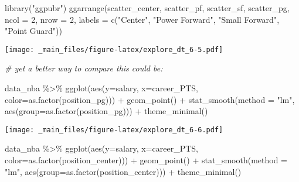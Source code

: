 \documentclass[
]{book}
\newenvironment{Shaded}{\begin{snugshade}}{\end{snugshade}}
\newcommand{\AttributeTok}[1]{\textcolor[rgb]{0.77,0.63,0.00}{#1}}
\newcommand{\CommentTok}[1]{\textcolor[rgb]{0.56,0.35,0.01}{\textit{#1}}}
\newcommand{\DecValTok}[1]{\textcolor[rgb]{0.00,0.00,0.81}{#1}}
\newcommand{\FunctionTok}[1]{\textcolor[rgb]{0.00,0.00,0.00}{#1}}
\newcommand{\NormalTok}[1]{#1}
\newcommand{\SpecialCharTok}[1]{\textcolor[rgb]{0.00,0.00,0.00}{#1}}
\newcommand{\StringTok}[1]{\textcolor[rgb]{0.31,0.60,0.02}{#1}}
\begin{document}
\begin{Shaded}
\begin{Highlighting}[]
\FunctionTok{library}\NormalTok{(}\StringTok{"ggpubr"}\NormalTok{)}
\FunctionTok{ggarrange}\NormalTok{(scatter\_center, scatter\_pf,}
\NormalTok{          scatter\_sf, scatter\_pg,}
          \AttributeTok{ncol =} \DecValTok{2}\NormalTok{, }\AttributeTok{nrow =} \DecValTok{2}\NormalTok{,}
          \AttributeTok{labels =} \FunctionTok{c}\NormalTok{(}\StringTok{"Center"}\NormalTok{,}
                     \StringTok{"Power Forward"}\NormalTok{,}
                     \StringTok{"Small Forward"}\NormalTok{,}
                     \StringTok{"Point Guard"}\NormalTok{))}
\end{Highlighting}
\end{Shaded}

\texttt{[image: \_main\_files/figure-latex/explore\_dt\_6-5.pdf]}

\begin{Shaded}
\begin{Highlighting}[]
\CommentTok{\# yet a better way to compare this could be:}

\NormalTok{data\_nba }\SpecialCharTok{\%\textgreater{}\%} 
  \FunctionTok{ggplot}\NormalTok{(}\FunctionTok{aes}\NormalTok{(}\AttributeTok{y=}\NormalTok{salary, }\AttributeTok{x=}\NormalTok{career\_PTS, }\AttributeTok{color=}\FunctionTok{as.factor}\NormalTok{(position\_pg))) }\SpecialCharTok{+}
    \FunctionTok{geom\_point}\NormalTok{() }\SpecialCharTok{+} 
     \FunctionTok{stat\_smooth}\NormalTok{(}\AttributeTok{method =} \StringTok{"lm"}\NormalTok{,}
                 \FunctionTok{aes}\NormalTok{(}\AttributeTok{group=}\FunctionTok{as.factor}\NormalTok{(position\_pg))) }\SpecialCharTok{+} 
       \FunctionTok{theme\_minimal}\NormalTok{()}
\end{Highlighting}
\end{Shaded}

\texttt{[image: \_main\_files/figure-latex/explore\_dt\_6-6.pdf]}

\begin{Shaded}
\begin{Highlighting}[]
\NormalTok{data\_nba }\SpecialCharTok{\%\textgreater{}\%} 
  \FunctionTok{ggplot}\NormalTok{(}\FunctionTok{aes}\NormalTok{(}\AttributeTok{y=}\NormalTok{salary, }\AttributeTok{x=}\NormalTok{career\_PTS, }\AttributeTok{color=}\FunctionTok{as.factor}\NormalTok{(position\_center))) }\SpecialCharTok{+}
    \FunctionTok{geom\_point}\NormalTok{() }\SpecialCharTok{+} 
     \FunctionTok{stat\_smooth}\NormalTok{(}\AttributeTok{method =} \StringTok{"lm"}\NormalTok{,}
                 \FunctionTok{aes}\NormalTok{(}\AttributeTok{group=}\FunctionTok{as.factor}\NormalTok{(position\_center))) }\SpecialCharTok{+} 
       \FunctionTok{theme\_minimal}\NormalTok{()}
\end{Highlighting}
\end{Shaded}
\end{document}
